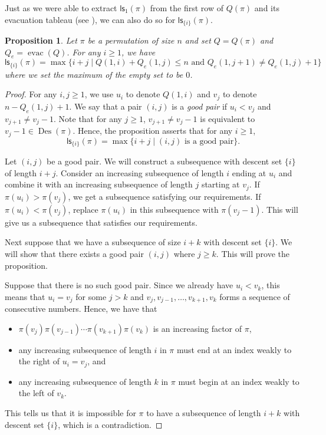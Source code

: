 \documentclass[12pt]{article}
\newcommand{\ls}{\mathsf{ls}}
\newcommand{\Des}{\operatorname{Des}}
\newcommand{\evac}{\operatorname{evac}}
\newtheorem{proposition}[theorem]{Proposition}
\theoremstyle{definition}
\begin{document}
Just as we were able to extract $\ls_1(\pi)$ from the first row of $Q(\pi)$ and its evacuation tableau (see ), we can also do so for $\ls_{\{i\}}(\pi)$.

\begin{proposition}\label{gsievac}
    Let $\pi$ be a permutation of size $n$ and set $Q = Q(\pi)$ and $Q_e = \evac(Q)$. 
    For any $i \geq 1$, we have
    \begin{equation*}
        \ls_{\{i\}}(\pi) = \operatorname{max}\{i + j \mid Q(1, i) + Q_e(1, j) \leq n\text{ and }Q_e(1, j + 1) \neq Q_e(1, j) + 1\}
    \end{equation*}
    where we set the maximum of the empty set to be $0$.
\end{proposition}

\begin{proof}
    For any $i, j \geq 1$, we use $u_i$ to denote $Q(1, i)$ and $v_j$ to denote $n - Q_e(1, j) + 1$. 
    We say that a pair $(i, j)$ is a \emph{good pair} if $u_i < v_j$ and $v_{j + 1} \neq v_j - 1$.
    Note that for any $j \geq 1$, $v_{j + 1} \neq v_j - 1$ is equivalent to $v_j - 1 \in \Des(\pi)$. 
    Hence, the proposition asserts that for any $i \geq 1$, $$\ls_{\{i\}}(\pi) = \operatorname{max}\{i + j \mid (i, j)\text{ is a good pair}\}.$$
    
    Let $(i, j)$ be a good pair. 
    We will construct a subsequence with descent set $\{i\}$ of length $i + j$. 
    Consider an increasing subsequence of length $i$ ending at $u_i$ and combine it with an increasing subsequence of length $j$ starting at $v_j$. 
    If $\pi(u_i) > \pi(v_j)$, we get a subsequence satisfying our requirements. 
    If $\pi(u_i) < \pi(v_j)$, replace $\pi(u_i)$ in this subsequence with $\pi(v_j - 1)$. 
    This will give us a subsequence that satisfies our requirements.

    Next suppose that we have a subsequence of size $i + k$ with descent set $\{i\}$. 
    We will show that there exists a good pair $(i, j)$ where $j \geq k$. 
    This will prove the proposition.
    
    Suppose that there is no such good pair. 
    Since we already have $u_i < v_k$, this means that $u_i = v_j$ for some $j > k$ and $v_j, v_{j - 1}, \ldots, v_{k + 1}, v_k$ forms a sequence of consecutive numbers. 
    Hence, we have that
    \begin{itemize}
        \item $\pi(v_j) \pi(v_{j - 1}) \cdots \pi(v_{k + 1}) \pi(v_k)$ is an increasing factor of $\pi$,
        \item any increasing subsequence of length $i$ in $\pi$ must end at an index weakly to the right of $u_i = v_j$, and
        \item any increasing subsequence of length $k$ in $\pi$ must begin at an index weakly to the left of $v_k$.
    \end{itemize}
    This tells us that it is impossible for $\pi$ to have a subsequence of length $i + k$ with descent set $\{i\}$, which is a contradiction.
\end{proof}
\end{document}
